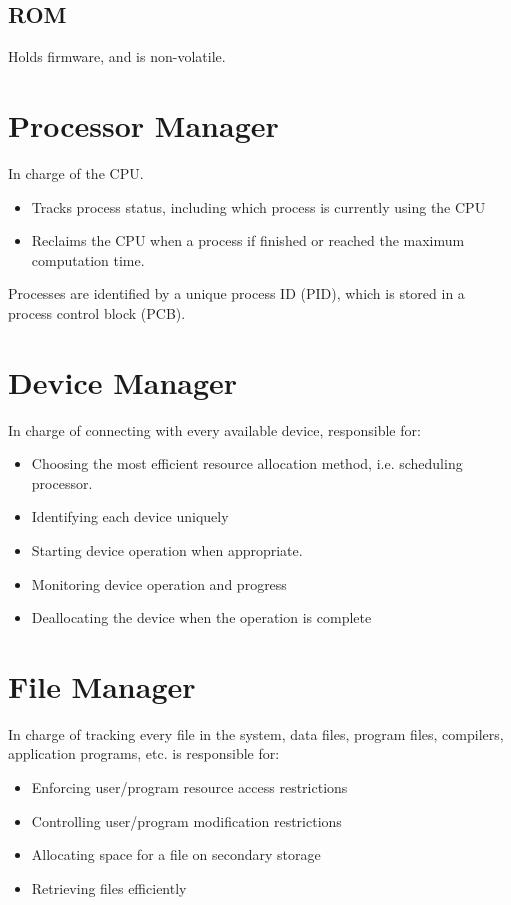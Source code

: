 \documentclass[12pt letter]{report}
\begin{document}
\subsection{ROM}
Holds firmware, and is non-volatile.

\section{Processor Manager}

In charge of the CPU.
\begin{itemize}
  \item Tracks process status, including which process is currently using the CPU
  \item Reclaims the CPU when a process if finished or reached the maximum computation time.
\end{itemize}

Processes are identified by a unique process ID (PID), which is stored in a process control block (PCB).

\section{Device Manager}

In charge of connecting with every available device, responsible for:
\begin{itemize}
  \item Choosing the most efficient resource allocation method, i.e. scheduling processor.
  \item Identifying each device uniquely
  \item Starting device operation when appropriate.
  \item Monitoring device operation and progress
  \item Deallocating the device when the operation is complete
\end{itemize}

\section{File Manager}

In charge of tracking every file in the system, data files, program files, compilers, application programs, etc. is responsible for:
\begin{itemize}
  \item Enforcing user/program resource access restrictions
  \item Controlling user/program modification restrictions
  \item Allocating space for a file on secondary storage
  \item Retrieving files efficiently
\end{itemize}
\end{document}
